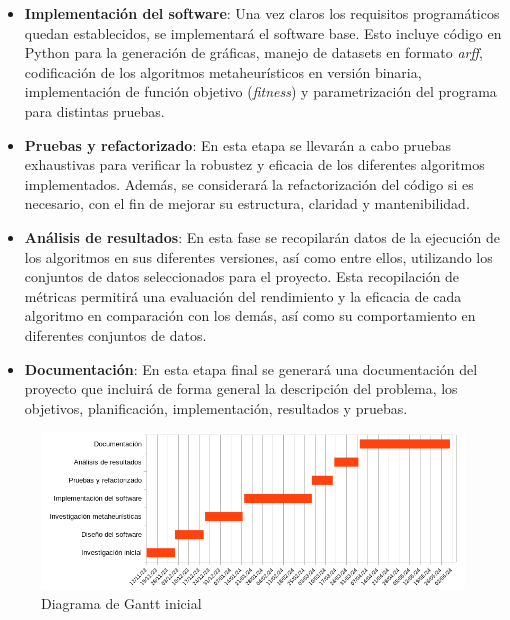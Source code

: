 \begin{itemize}
      \item \textbf{Implementación del software}: Una vez claros los requisitos programáticos quedan establecidos, se implementará el software base. Esto incluye código en Python para la generación de gráficas, manejo de datasets en formato \textit{arff}, codificación de los algoritmos metaheurísticos en versión binaria, implementación de función objetivo (\textit{fitness}) y parametrización del programa para distintas pruebas.
      \item \textbf{Pruebas y refactorizado}: En esta etapa se llevarán a cabo pruebas exhaustivas para verificar la robustez y eficacia de los diferentes algoritmos implementados. Además, se considerará la refactorización del código si es necesario, con el fin de mejorar su estructura, claridad y mantenibilidad.
      \item \textbf{Análisis de resultados}: En esta fase se recopilarán datos de la ejecución de los algoritmos en sus diferentes versiones, así como entre ellos, utilizando los conjuntos de datos seleccionados para el proyecto. Esta recopilación de métricas permitirá una evaluación del rendimiento y la eficacia de cada algoritmo en comparación con los demás, así como su comportamiento en diferentes conjuntos de datos.
      \item \textbf{Documentación}: En esta etapa final se generará una documentación del proyecto que incluirá de forma general la descripción del problema, los objetivos, planificación, implementación, resultados y pruebas.
\end{itemize}

\begin{figure}[H]
      \begin{center}
            \includegraphics[width=1\textwidth]{imagenes/gantt-init.png}
      \end{center}
      \caption{Diagrama de Gantt inicial}
\end{figure}

